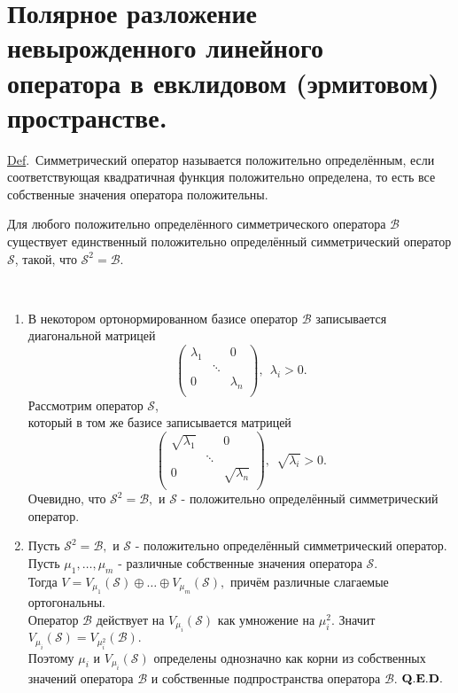 \documentclass[a4paper]{article}%
\renewcommand{\de}{\par\noindent\underline{Def}.\ }%
\renewcommand{\ab}{\par\noindent}%
\newcommand{\dok}{\par\noindent{\textsl{Доказательство}.}\ }%
\newcommand{\qed}{\quad${{\bf Q.E.D.}}$}
\newcommand{\ps}{\oplus}
\newcommand{\op}[1]{$\mathcal{#1}$}
\renewcommand{\om}[1]{\mathcal{#1}}
\begin{document}
\section{Полярное разложение невырожденного линейного\\ оператора в евклидовом (эрмитовом) пространстве.}
\label{q32}%
\de Симметрический оператор называется положительно определённым, если соответствующая квадратичная функция
положительно определена, то есть все собственные значения оператора положительны. %
\ab{\bf Лемма.} Для любого положительно определённого симметрического оператора \op{B} существует
единственный
положительно определённый симметрический оператор \op{S}, такой, что $\om{S}^2=\om{B}$.%
\dok \begin{enumerate}
    \item В некотором ортонормированном базисе оператор $\om{B}$ записывается диагональной матрицей
    $$\left(%
\begin{array}{ccc}
  \lambda_1 &  & 0 \\
   & \ddots &  \\
  0 &  & \lambda_n \\
\end{array}%
\right),\  \ \lambda_i>0.$$ Рассмотрим оператор \op{S},\\ который в том же базисе записывается матрицей
$$\left(%
\begin{array}{ccc}
  \sqrt{\lambda_1} &  & 0 \\
   & \ddots &  \\
  0 &  & \sqrt{\lambda_n} \\
\end{array}%
\right),\ \ \sqrt{\lambda_i}>0.$$
Очевидно, что $\om{S}^2=\om{B},$ и \op{S} - положительно определённый симметрический оператор.
    \item Пусть $\om{S}^2=\om{B},$ и \op{S} - положительно определённый симметрический оператор.\\
    Пусть $\mu_1,\dots,\mu_m$ - различные собственные значения оператора \op{S}.\\
    Тогда $V=V_{\mu_1}(\om{S})\ps\dots\ps V_{\mu_{m}}(\om{S}),$
    причём различные слагаемые ортогональны.\\ Оператор \op{B} действует на $V_{\mu_i}(\om{S})$ как умножение на
    $\mu_i^2$. Значит $V_{\mu_i}(\om{S})=V_{\mu_i^2}(\om{B}).$\\ Поэтому $\mu_i$ и $V_{\mu_i}(\om{S})$ определены
    однозначно как корни из собственных значений оператора $\om{B}$ и собственные подпространства оператора
    $\om{B}$. \qed
\end{enumerate}
\end{document}
